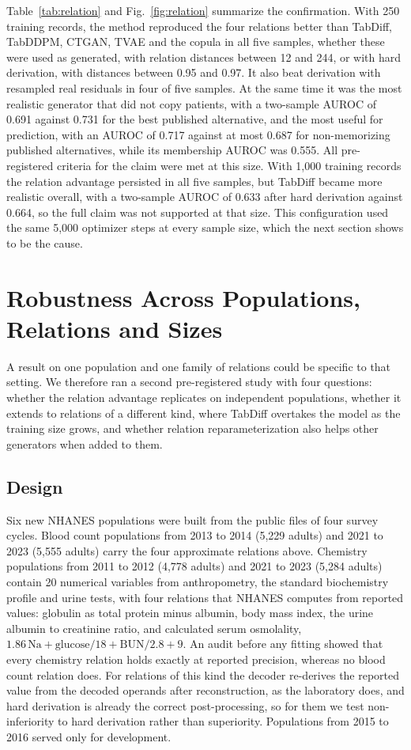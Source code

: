 \documentclass[conference]{IEEEtran}
\begin{document}
Table~\ref{tab:relation} and Fig.~\ref{fig:relation} summarize the confirmation. With 250 training records, the method reproduced the four relations better than TabDiff, TabDDPM, CTGAN, TVAE and the copula in all five samples, whether these were used as generated, with relation distances between 12 and 244, or with hard derivation, with distances between 0.95 and 0.97. It also beat derivation with resampled real residuals in four of five samples. At the same time it was the most realistic generator that did not copy patients, with a two-sample AUROC of 0.691 against 0.731 for the best published alternative, and the most useful for prediction, with an AUROC of 0.717 against at most 0.687 for non-memorizing published alternatives, while its membership AUROC was 0.555. All pre-registered criteria for the claim were met at this size. With 1,000 training records the relation advantage persisted in all five samples, but TabDiff became more realistic overall, with a two-sample AUROC of 0.633 after hard derivation against 0.664, so the full claim was not supported at that size. This configuration used the same 5,000 optimizer steps at every sample size, which the next section shows to be the cause.

\section{Robustness Across Populations, Relations and Sizes}

A result on one population and one family of relations could be specific to that setting. We therefore ran a second pre-registered study with four questions: whether the relation advantage replicates on independent populations, whether it extends to relations of a different kind, where TabDiff overtakes the model as the training size grows, and whether relation reparameterization also helps other generators when added to them.

\subsection*{Design}

Six new NHANES populations were built from the public files of four survey cycles. Blood count populations from 2013 to 2014 (5,229 adults) and 2021 to 2023 (5,555 adults) carry the four approximate relations above. Chemistry populations from 2011 to 2012 (4,778 adults) and 2021 to 2023 (5,284 adults) contain 20 numerical variables from anthropometry, the standard biochemistry profile and urine tests, with four relations that NHANES computes from reported values: globulin as total protein minus albumin, body mass index, the urine albumin to creatinine ratio, and calculated serum osmolality, $1.86\,\text{Na} + \text{glucose}/18 + \text{BUN}/2.8 + 9$. An audit before any fitting showed that every chemistry relation holds exactly at reported precision, whereas no blood count relation does. For relations of this kind the decoder re-derives the reported value from the decoded operands after reconstruction, as the laboratory does, and hard derivation is already the correct post-processing, so for them we test non-inferiority to hard derivation rather than superiority. Populations from 2015 to 2016 served only for development.
\end{document}
